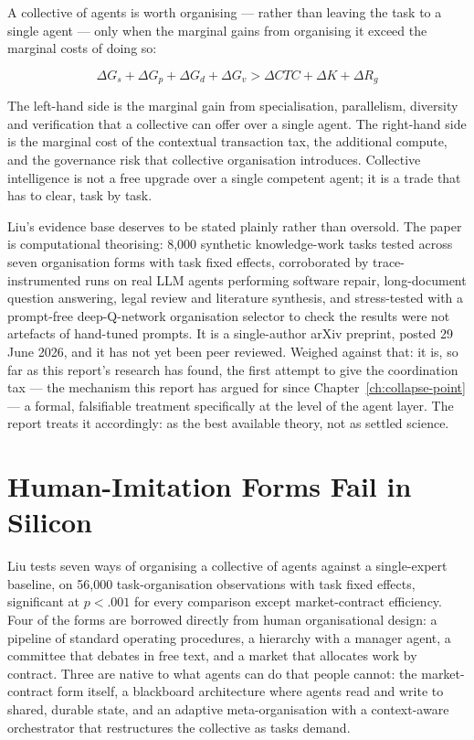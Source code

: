 A collective of agents is worth organising --- rather than leaving the task to a single agent --- only when the marginal gains from organising it exceed the marginal costs of doing so:

\[
\Delta G_s + \Delta G_p + \Delta G_d + \Delta G_v > \Delta CTC + \Delta K + \Delta R_g
\]

The left-hand side is the marginal gain from specialisation, parallelism, diversity and verification that a collective can offer over a single agent. The right-hand side is the marginal cost of the contextual transaction tax, the additional compute, and the governance risk that collective organisation introduces. Collective intelligence is not a free upgrade over a single competent agent; it is a trade that has to clear, task by task.

Liu's evidence base deserves to be stated plainly rather than oversold. The paper is computational theorising: 8,000 synthetic knowledge-work tasks tested across seven organisation forms with task fixed effects, corroborated by trace-instrumented runs on real LLM agents performing software repair, long-document question answering, legal review and literature synthesis, and stress-tested with a prompt-free deep-Q-network organisation selector to check the results were not artefacts of hand-tuned prompts. It is a single-author arXiv preprint, posted 29 June 2026, and it has not yet been peer reviewed. Weighed against that: it is, so far as this report's research has found, the first attempt to give the coordination tax --- the mechanism this report has argued for since Chapter~\ref{ch:collapse-point} --- a formal, falsifiable treatment specifically at the level of the agent layer. The report treats it accordingly: as the best available theory, not as settled science.

\section{Human-Imitation Forms Fail in Silicon}

Liu tests seven ways of organising a collective of agents against a single-expert baseline, on 56,000 task-organisation observations with task fixed effects, significant at $p < .001$ for every comparison except market-contract efficiency. Four of the forms are borrowed directly from human organisational design: a pipeline of standard operating procedures, a hierarchy with a manager agent, a committee that debates in free text, and a market that allocates work by contract. Three are native to what agents can do that people cannot: the market-contract form itself, a blackboard architecture where agents read and write to shared, durable state, and an adaptive meta-organisation with a context-aware orchestrator that restructures the collective as tasks demand.


